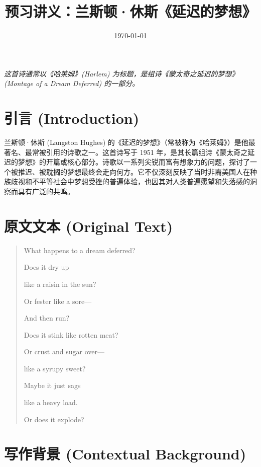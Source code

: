 \documentclass[12pt, a4paper]{article}
\title{\textbf{预习讲义：兰斯顿·休斯《延迟的梦想》}}
\date{\today}
\begin{document}
\maketitle
\begin{center}
    \textit{这首诗通常以《哈莱姆》(Harlem) 为标题，是组诗《蒙太奇之延迟的梦想》(Montage of a Dream Deferred) 的一部分。}
\end{center}

\section{引言 (Introduction)}

兰斯顿·休斯 (Langston Hughes) 的《延迟的梦想》（常被称为《哈莱姆》）是他最著名、最常被引用的诗歌之一。这首诗写于 1951 年，是其长篇组诗《蒙太奇之延迟的梦想》的开篇或核心部分。诗歌以一系列尖锐而富有想象力的问题，探讨了一个被推迟、被耽搁的梦想最终会走向何方。它不仅深刻反映了当时非裔美国人在种族歧视和不平等社会中梦想受挫的普遍体验，也因其对人类普遍愿望和失落感的洞察而具有广泛的共鸣。

\section{原文文本 (Original Text)}

\begin{quote}
\RaggedRight %
{\linespread{1.1} %

What happens to a dream deferred? 

Does it dry up 

like a raisin in the sun? 

Or fester like a sore— 

And then run? 

Does it stink like rotten meat? 

Or crust and sugar over— 

like a syrupy sweet? 

Maybe it just sags 

like a heavy load. 

Or does it explode?
}
\end{quote}

\section{写作背景 (Contextual Background)}
\end{document}
